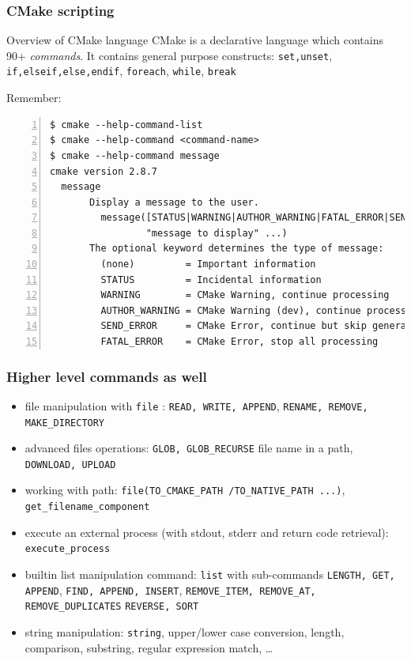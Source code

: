 \documentclass[compress,slidestop,table
              ]
               {beamer}
\begin{document}
\begin{frame}[fragile]
\frametitle{CMake scripting}
\begin{block}{Overview of CMake language}
CMake is a declarative language which contains 90+ \emph{commands}.
It contains general purpose constructs:
\lstinline!set,unset!,
\lstinline!if,elseif,else,endif!,
\lstinline!foreach!,
\lstinline!while!, \lstinline!break!
\end{block}
Remember:
\begin{Verbatim}[fontsize=\tiny,numbers=left]
$ cmake --help-command-list
$ cmake --help-command <command-name>
$ cmake --help-command message
cmake version 2.8.7
  message
       Display a message to the user.
         message([STATUS|WARNING|AUTHOR_WARNING|FATAL_ERROR|SEND_ERROR]
                 "message to display" ...)
       The optional keyword determines the type of message:
         (none)         = Important information
         STATUS         = Incidental information
         WARNING        = CMake Warning, continue processing
         AUTHOR_WARNING = CMake Warning (dev), continue processing
         SEND_ERROR     = CMake Error, continue but skip generation
         FATAL_ERROR    = CMake Error, stop all processing
\end{Verbatim}
\end{frame}

\begin{frame}[fragile]
\frametitle{Higher level commands as well}
\lstset{basicstyle=\scriptsize}
\begin{itemize}
\item file manipulation with \lstinline[basicstyle=\normalsize]!file! : \lstinline!READ, WRITE, APPEND!,
      \lstinline!RENAME, REMOVE, MAKE_DIRECTORY!
      
\item advanced files operations: \lstinline!GLOB, GLOB_RECURSE! file name in a path,
      \lstinline!DOWNLOAD, UPLOAD!
\item working with path: \lstinline[basicstyle=\normalsize]!file!\lstinline!(TO_CMAKE_PATH /TO_NATIVE_PATH ...)!, \lstinline[basicstyle=\normalsize]!get_filename_component!
\item execute an external process (with stdout, stderr and return code retrieval): \lstinline[basicstyle=\normalsize]!execute_process!
\item builtin list manipulation command: \lstinline[basicstyle=\normalsize]!list! with sub-commands
      \lstinline!LENGTH, GET, APPEND!,
      \lstinline!FIND, APPEND, INSERT!,
      \lstinline!REMOVE_ITEM, REMOVE_AT, REMOVE_DUPLICATES!
      \lstinline!REVERSE, SORT!
\item string manipulation: \lstinline[basicstyle=\normalsize]!string!, upper/lower case conversion, length, comparison,
      substring, regular expression match, \ldots
\end{itemize}
\lstset{basicstyle=\normalsize}
\end{frame}
\end{document}
